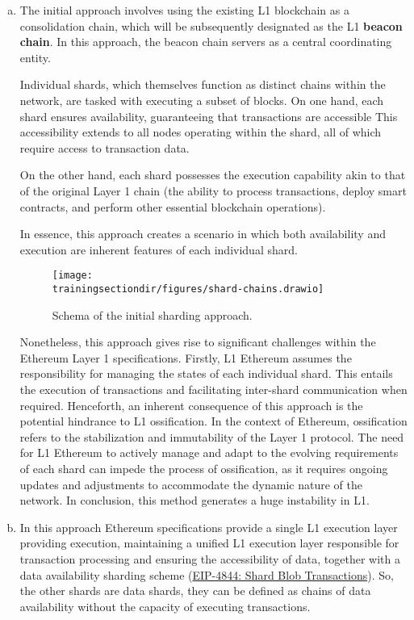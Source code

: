 \begin{enumerate}[(a)]

\item The initial approach involves using the existing L1 blockchain as a consolidation chain, which will be subsequently designated as the L1 \textbf{beacon chain}. In this approach, the beacon chain servers as a central coordinating entity.

Individual shards, which themselves function as distinct chains within the network, are tasked with executing a subset of blocks. On one hand, each shard ensures availability, guaranteeing that transactions are accessible This accessibility extends to all nodes operating within the shard, all of which require access to transaction data.

On the other hand, each shard possesses the execution capability akin to that of the original Layer 1 chain (the ability to process transactions, deploy smart contracts, and perform other essential blockchain operations).

In essence, this approach creates a scenario in which both availability and execution are inherent features of each individual shard.

\begin{figure}[H]
\centering
\texttt{[image: \\trainingsectiondir/figures/shard-chains.drawio]}
\caption{Schema of the initial sharding approach.}
\end{figure}

Nonetheless, this approach gives rise to significant challenges within the Ethereum Layer 1 specifications. Firstly, L1 Ethereum assumes the responsibility for managing the states of each individual shard. This entails the execution of transactions and facilitating inter-shard communication when required. Henceforth, an inherent consequence of this approach is the potential hindrance to L1 ossification. In the context of Ethereum, ossification refers to the stabilization and immutability of the Layer 1 protocol. The need for L1 Ethereum to actively manage and adapt to the evolving requirements of each shard can impede the process of ossification, as it requires ongoing updates and adjustments to accommodate the dynamic nature of the network. In conclusion, this method generates a huge instability in L1.


\item In this approach Ethereum specifications provide a single L1 execution layer providing execution, maintaining a unified L1 execution layer responsible for transaction processing and ensuring the accessibility of data, together with a data availability sharding scheme (\href{https://eips.ethereum.org/EIPS/eip-4844}{EIP-4844: Shard Blob Transactions}). So, the other shards are data shards, they can be defined as chains of data availability without the capacity of executing transactions.


\end{enumerate}
